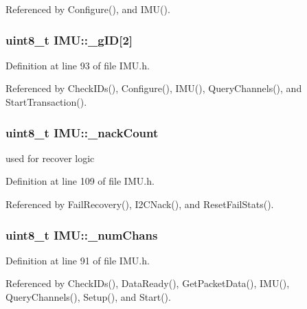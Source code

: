 Referenced by Configure(), and IMU().

\hypertarget{class_i_m_u_a47ffe20a032e3a890cd3891793a60a40}{
\subsubsection[{\_\-gID}]{\setlength{\rightskip}{0pt plus 5cm}uint8\_\-t {\bf IMU::\_\-gID}\mbox{[}2\mbox{]}}}
\label{class_i_m_u_a47ffe20a032e3a890cd3891793a60a40}


Definition at line 93 of file IMU.h.



Referenced by CheckIDs(), Configure(), IMU(), QueryChannels(), and StartTransaction().

\hypertarget{class_i_m_u_a30c8553ab21b5d6e618c2616f25dafb1}{
\subsubsection[{\_\-nackCount}]{\setlength{\rightskip}{0pt plus 5cm}uint8\_\-t {\bf IMU::\_\-nackCount}}}
\label{class_i_m_u_a30c8553ab21b5d6e618c2616f25dafb1}


used for recover logic 



Definition at line 109 of file IMU.h.



Referenced by FailRecovery(), I2CNack(), and ResetFailStats().

\hypertarget{class_i_m_u_a27df580b4559aaf3234469bfe16eb158}{
\subsubsection[{\_\-numChans}]{\setlength{\rightskip}{0pt plus 5cm}uint8\_\-t {\bf IMU::\_\-numChans}}}
\label{class_i_m_u_a27df580b4559aaf3234469bfe16eb158}


Definition at line 91 of file IMU.h.



Referenced by CheckIDs(), DataReady(), GetPacketData(), IMU(), QueryChannels(), Setup(), and Start().

